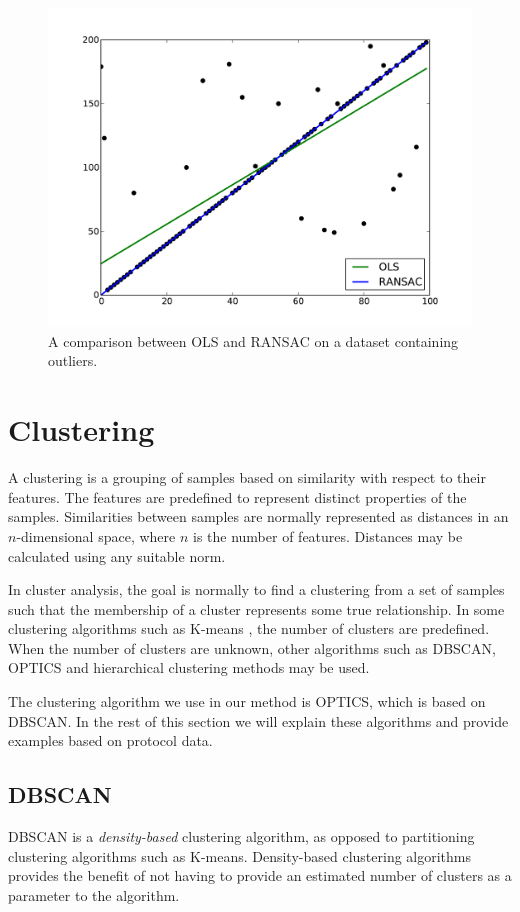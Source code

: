 \documentclass[a4paper]{report}
\begin{document}
\begin{figure}[t]
    \includegraphics[width=\linewidth]{ransac}
    \caption{A comparison between OLS and RANSAC on a dataset containing
    outliers.}
    \label{fig:ransac}
\end{figure}

\section{Clustering}
A clustering is a grouping of samples based on similarity with respect to their
features. The features are predefined to represent distinct properties of the
samples. Similarities between samples are normally represented as distances in
an $n$-dimensional space, where $n$ is the number of features. Distances may be
calculated using any suitable norm.

In cluster analysis, the goal is normally to find a clustering from a
set of samples such that the membership of a cluster represents some true
relationship. In some clustering algorithms such as K-means \citep{macqueen67},
the number of clusters are predefined. When the number of clusters are unknown,
other algorithms such as DBSCAN, OPTICS and hierarchical clustering methods may
be used.

The clustering algorithm we use in our method is OPTICS, which is based on
DBSCAN. In the rest of this section we will explain these algorithms and
provide examples based on protocol data.

\subsection{DBSCAN}
DBSCAN is a \emph{density-based} clustering algorithm, as opposed to
partitioning clustering algorithms such as K-means. Density-based clustering 
algorithms provides the benefit of not having to provide an estimated number 
of clusters as a parameter to the algorithm.
\end{document}
